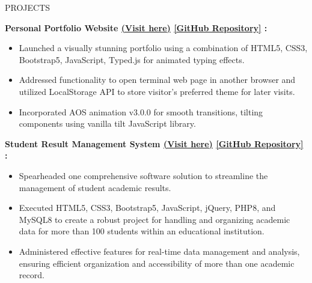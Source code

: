 \documentclass{resume} %
\begin{document}
\begin{rSection}{PROJECTS}
    \vspace{-1.0em}
    
     \item \textbf{Personal Portfolio Website
    {\href{https://arkapg211002.github.io/}{(Visit here)}}
    {\href{https://github.com/arkapg211002/arkapg211002.github.io}{[GitHub Repository]}} :} 
    \vspace{-0.6em}
    \begin{itemize}
    \setlength\itemsep{-0.6em}
    \item Launched a visually stunning portfolio using a combination of HTML5, CSS3, Bootstrap5, JavaScript, Typed.js for animated typing effects.
    \item Addressed functionality to open terminal web page in another browser and utilized LocalStorage API to store visitor’s preferred theme for later visits.
    \item Incorporated AOS animation v3.0.0 for smooth transitions, tilting components using vanilla tilt JavaScript library.
    \end{itemize}
    
    \item \textbf{Student Result Management System 
    {\href{https://arkaphpcrud.000webhostapp.com/index.php}{(Visit here)}}
    {\href{https://github.com/arkapg211002/Student-Result-Management-System}{[GitHub Repository]}} :}
    \vspace{-0.6em}
    \begin{itemize}
    \setlength\itemsep{-0.6em}
     \item Spearheaded one comprehensive software solution to streamline the management of student academic results.
    \item Executed HTML5, CSS3, Bootstrap5, JavaScript, jQuery, PHP8, and MySQL8 to create a robust project for handling and organizing academic data for more than 100 students within an educational institution.
    \item Administered effective features for real-time data management and analysis, ensuring efficient organization and accessibility of more than one academic record.
    \end{itemize}
    

\end{rSection}
\end{document}
